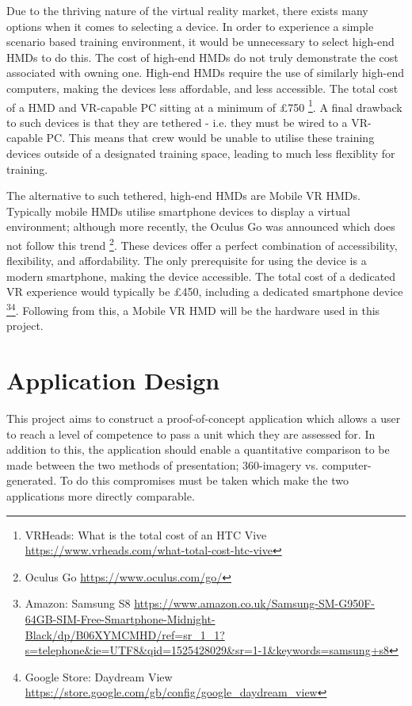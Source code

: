 \documentclass[ %
                    author={Elis Jones},
                supervisor={Dr. Kirsten Cater},
                    degree={BSc},
                     title={The Effect of Presentation Medium on Spatial Cognition},
                  subtitle={in the Virtual Environment},
                      year={2018} ]{dissertation}
\begin{document}
Due to the thriving nature of the virtual reality market, there exists many options when it comes to selecting a device. In order to experience a simple scenario based training environment, it would be unnecessary to select high-end HMDs to do this. The cost of high-end HMDs do not truly demonstrate the cost associated with owning one. High-end HMDs require the use of similarly high-end computers, making the devices less affordable, and less accessible. The total cost of a HMD and VR-capable PC sitting at a minimum of £750 \footnote{VRHeads: What is the total cost of an HTC Vive \url{https://www.vrheads.com/what-total-cost-htc-vive}}. A final drawback to such devices is that they are tethered - i.e. they must be wired to a VR-capable PC. This means that crew would be unable to utilise these training devices outside of a designated training space, leading to much less flexiblity for training. 

The alternative to such tethered, high-end HMDs are Mobile VR HMDs. Typically mobile HMDs utilise smartphone devices to display a virtual environment; although more recently, the Oculus Go was announced which does not follow this trend \footnote{Oculus Go \url{https://www.oculus.com/go/}}. These devices offer a perfect combination of accessibility, flexibility, and affordability. The only prerequisite for using the device is a modern smartphone, making the device accessible. The total cost of a dedicated VR experience would typically be £450, including a dedicated smartphone device \footnote{Amazon: Samsung S8 \url{https://www.amazon.co.uk/Samsung-SM-G950F-64GB-SIM-Free-Smartphone-Midnight-Black/dp/B06XYMCMHD/ref=sr_1_1?s=telephone&ie=UTF8&qid=1525428029&sr=1-1&keywords=samsung+s8}}\footnote{Google Store: Daydream View \url{https://store.google.com/gb/config/google_daydream_view}}. Following from this, a Mobile VR HMD will be the hardware used in this project.

\section{Application Design}
This project aims to construct a proof-of-concept application which allows a user to reach a level of competence to pass a unit which they are assessed for. In addition to this, the application should enable a quantitative comparison to be made between the two methods of presentation; 360-imagery vs. computer-generated. To do this compromises must be taken which make the two applications more directly comparable. 
\end{document}
